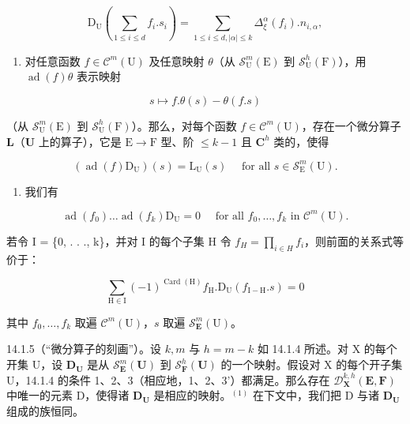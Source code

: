\[
\mathrm{D} _ {\mathrm{U}} \left(\sum_ {1 \leqslant i \leqslant d} f _ {i}. s _ {i}\right) = \sum_ {1 \leqslant i \leqslant d, | \alpha | \leqslant k} \Delta_ {\xi} ^ {\alpha} (f _ {i}). n _ {i, \alpha},
\]

\begin{enumerate}
\def\labelenumi{(\arabic{enumi})}
\setcounter{enumi}{3}
\tightlist
\item
  对任意函数 \(f \in \mathcal{C}^m(\mathrm{U})\) 及任意映射 \(\theta\)（从 \(\mathcal{S}_{\mathrm{U}}^{m}(\mathrm{E})\) 到 \(\mathcal{S}_{\mathrm{U}}^{h}(\mathrm{F})\)），用 \(\operatorname{ad}(f)\theta\) 表示映射
\end{enumerate}

\[
s \mapsto f. \theta (s) - \theta (f. s)
\]

（从 \(\mathcal{S}_{\mathrm{U}}^{m}(\mathrm{E})\) 到 \(\mathcal{S}_{\mathrm{U}}^{h}(\mathrm{F})\)）。那么，对每个函数 \(f \in \mathcal{C}^{m}(\mathrm{U})\)，存在一个微分算子 \(\mathbf{L}\)（\(\mathbf{U}\) 上的算子），它是 \(\mathrm{E} \to \mathrm{F}\) 型、阶 \(\leqslant k - 1\) 且 \(\mathbf{C}^{h}\) 类的，使得

\[
(\operatorname{ad} (f) \mathrm{D} _ {\mathrm{U}}) (s) = \mathrm{L} _{\mathrm{U}}(s) \quad \text { for all } s \in \mathscr{S}_{\mathrm{E}}^{m}(\mathrm{U}).
\]

\begin{enumerate}
\def\labelenumi{(\arabic{enumi})}
\setcounter{enumi}{4}
\tightlist
\item
  我们有
\end{enumerate}

\[
\operatorname{ad} (f _ {0}) \dots \operatorname{ad} (f _ {k}) \mathrm{D} _ {\mathrm{U}} = 0 \quad \text { for all } f _ {0}, \dots , f _ {k} \text { in } \mathscr {C} ^ {m} (\mathrm{U}).
\]

若令 I = \{0, . . ., k\}，并对 I 的每个子集 H 令 \(f_{H} = \prod_{i \in H} f_i\)，则前面的关系式等价于：

\[
\sum_ {\mathrm{H} \in \mathrm{I}} (- 1) ^ {\operatorname{Card} (\mathrm{H})} f _ {\mathrm{H}}. \mathrm{D} _ {\mathrm{U}} (f _ {\mathrm{I-H}}. s) = 0
\]

其中 \(f_{0},\ldots,f_{k}\) 取遍 \(\mathcal{C}^{m}(\mathrm{U})\)，\(s\) 取遍 \(\mathcal{S}_{\mathbf{E}}^{m}(\mathrm{U})\)。

14.1.5（“微分算子的刻画”）。设 \(k, m\) 与 \(h = m - k\) 如 14.1.4 所述。对 X 的每个开集 U，设 \(\mathbf{D}_{\mathbf{U}}\) 是从 \(\mathcal{S}_{\mathbf{E}}^{m}(\mathbf{U})\) 到 \(\mathcal{S}_{\mathbf{F}}^{h}(\mathbf{U})\) 的一个映射。假设对 X 的每个开子集 U，14.1.4 的条件 1、2、3（相应地，1、2、3'）都满足。那么存在 \(\mathcal{D}_{\mathbf{X}}^{k,h}(\mathbf{E},\mathbf{F})\) 中唯一的元素 D，使得诸 \(\mathbf{D}_{\mathbf{U}}\) 是相应的映射。\(^{(1)}\) 在下文中，我们把 D 与诸 \(\mathbf{D}_{\mathbf{U}}\) 组成的族恒同。

